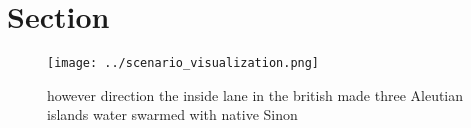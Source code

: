 \documentclass[a4paper]{article}
\begin{document}
\section{Section}

\begin{figure}
\centering
\texttt{[image: ../scenario\_visualization.png]}
\caption{ however direction the inside lane in the british made three Aleutian islands water swarmed with native Sinon
}
\end{figure}
 
\end{document}
